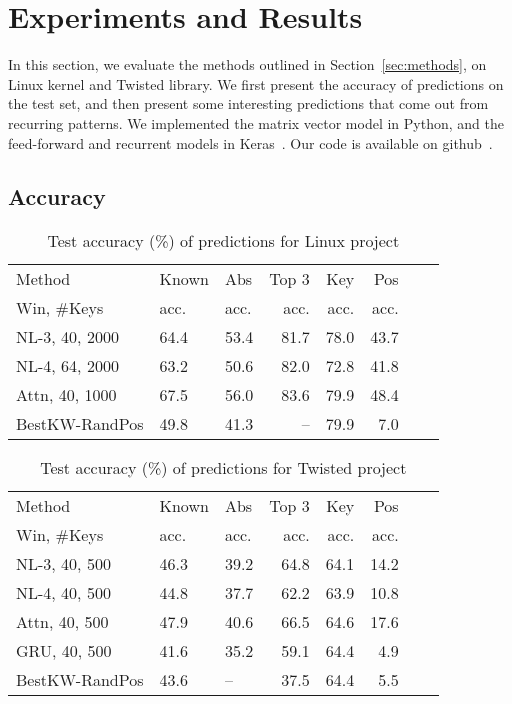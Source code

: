 \section{Experiments and Results}
\label{sec:results}

In this section, we evaluate the methods outlined in Section~\ref{sec:methods},
on Linux kernel and Twisted library. We first present the accuracy of
predictions on the test set, and then present some interesting predictions that
come out from recurring patterns. We implemented the matrix vector model in
Python, and the feed-forward and recurrent models in Keras~\cite{ref:keras}.
Our code is available on github~\cite{ref:codecompletion}.

\subsection{Accuracy}
\label{sec:accuracy}

\begin{table}[h]
  \centering
  \begin{tabular}{l l l r r r r r}
    \hline
    Method & Known & Abs & Top 3 & Key & Pos \\
    Win, \#Keys & acc. & acc. & acc.  & acc. & acc. \\
    \hline
    NL-3, 40, 2000 & 64.4 & 53.4 & 81.7 & 78.0 & 43.7\\
    NL-4, 64, 2000 & 63.2 & 50.6 & 82.0 & 72.8 & 41.8\\
    Attn, 40, 1000 & 67.5 & 56.0 & 83.6 & 79.9 & 48.4\\
    BestKW-RandPos & 49.8 & 41.3 & -- & 79.9 & 7.0\\
    \hline
  \end{tabular}
  \caption{Test accuracy (\%) of predictions for Linux project}
  \label{tab:linux}
\end{table}

\begin{table}[h]
  \centering
  \begin{tabular}{l l l r r r r r}
    \hline
    Method & Known & Abs & Top 3 & Key & Pos \\
    Win, \#Keys & acc. & acc. & acc.  & acc. & acc. \\
    \hline
    NL-3, 40, 500 & 46.3 & 39.2 & 64.8 & 64.1 & 14.2\\
    NL-4, 40, 500 & 44.8 & 37.7 & 62.2 & 63.9 & 10.8\\
    Attn, 40, 500 & 47.9 & 40.6 & 66.5 & 64.6 & 17.6\\
    GRU, 40, 500 & 41.6 & 35.2 & 59.1 & 64.4 & 4.9\\
    BestKW-RandPos & 43.6 & -- & 37.5 & 64.4 & 5.5\\
    \hline
  \end{tabular}
  \caption{Test accuracy (\%) of predictions for Twisted project}
  \label{tab:twisted}
\end{table}

